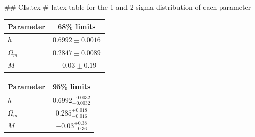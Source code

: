 ## CIs.tex
# latex table for the 1 and 2 sigma distribution of each parameter

\begin{tabular} { l  c}
 Parameter &  68\% limits\\
\hline
{\boldmath$h              $} & $0.6992\pm 0.0016          $\\
{\boldmath$\Omega_m       $} & $0.2847\pm 0.0089          $\\
{\boldmath$M              $} & $-0.03\pm 0.19             $\\
\hline
\end{tabular}

\begin{tabular} { l  c}
 Parameter &  95\% limits\\
\hline
{\boldmath$h              $} & $0.6992^{+0.0032}_{-0.0032}$\\
{\boldmath$\Omega_m       $} & $0.285^{+0.018}_{-0.016}   $\\
{\boldmath$M              $} & $-0.03^{+0.38}_{-0.36}     $\\
\hline
\end{tabular}
